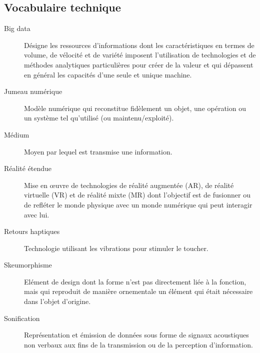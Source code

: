\documentclass[a4paper,12pt]{article}
\begin{document}
\begin{multicols}{2}
\subsection*{Vocabulaire technique}
\label{sec:org02a0254}
\begin{description}
\item[{Big data}] Désigne les ressources d’informations dont les caractéristiques en termes de volume, de vélocité et de variété imposent l’utilisation de technologies et de méthodes analytiques particulières pour créer de la valeur et qui dépassent en général les capacités d'une seule et unique machine.
\item[{Jumeau numérique}] Modèle numérique qui reconstitue fidèlement un objet, une opération ou un système tel qu'utilisé (ou maintenu/exploité).
\item[{Médium}] Moyen par lequel est transmise une information.
\item[{Réalité étendue}] Mise en œuvre de technologies de réalité augmentée (AR), de réalité virtuelle (VR) et de réalité mixte (MR) dont l'objectif est de fusionner ou de refléter le monde physique avec un monde numérique qui peut interagir avec lui.
\item[{Retours haptiques}] Technologie utilisant les vibrations pour stimuler le toucher.
\item[{Skeumorphisme}] Elément de design dont la forme n'est pas directement liée à la fonction, mais qui reproduit de manière ornementale un élément qui était nécessaire dans l'objet d'origine.
\item[{Sonification}] Représentation et émission de données sous forme de signaux acoustiques non verbaux aux fins de la transmission ou de la perception d’information.
\end{description}

\end{multicols}
\end{document}

